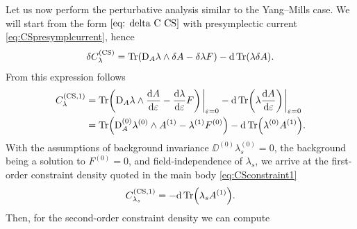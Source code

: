 \documentclass[]{jkpaper}
\theoremstyle{plain}
\theoremstyle{definition}
\newcommand{\eps}{\varepsilon}
\newcommand{\sd}{\mathrm {d}}
\newcommand{\fd}{\delta}
\newcommand{\DD}[1]{\text{D}_A#1}
\begin{document}
Let us now perform the perturbative analysis similar to the Yang--Mills case. We will start from the form $\eqref{eq: delta C CS}$ with presymplectic current \eqref{eq:CSpresymplcurrent}, hence 
\begin{equation}
    \delta C^{(\text{CS})}_{\lambda} 
    =  \Tr(\DD \lambda \wedge \delta A - \delta\lambda F)-\sd\Tr(\lambda \fd A).
\end{equation}
From this expression follows 
\begin{equation}
    \begin{split}
        C_\lambda^{(\text{CS},1)} &=  \Tr(\DD \lambda \wedge \dv{A}{\eps} - \dv{\lambda}{\eps} F)  \eval_{\eps = 0} -  \dd \Tr(\lambda \dv{A}{\eps}) \eval_{\eps = 0}
        \\
        &=  \Tr(\DD^{(0)} \lambda^{(0)} \wedge A^{(1)} - \lambda^{(1)} F^{(0)}) -  \dd \Tr(\lambda^{(0)} A^{(1)}).
    \end{split}
\end{equation}
With the assumptions of background invariance $\DD^{(0)} \lambda_s^{(0)} = 0$, the background being a solution to $F^{(0)} = 0$, and field-independence of $\lambda_s$, we arrive at the first-order constraint density quoted in the main body \eqref{eq:CSconstraint1}
\begin{equation}
    C_{\lambda_s}^{(\text{CS},1)} = -  \dd \Tr(\lambda_s A^{(1)}).
\end{equation}
Then, for the second-order constraint density we can compute
\end{document}
